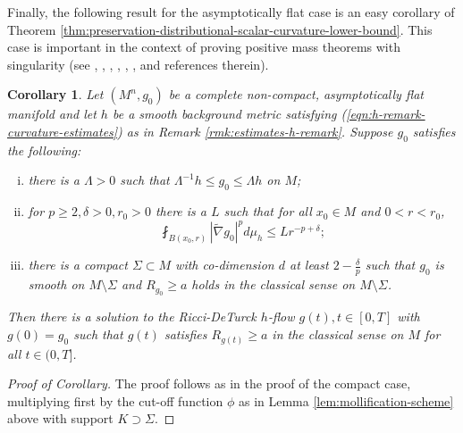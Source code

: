 \documentclass[12pt]{amsart}
\newcommand{\hdel}{\tilde{\nabla}}
\newtheorem{cor}[thm]{Corollary}
\theoremstyle{remark}
\numberwithin{equation}{section}
\begin{document}
Finally, the following result for the asymptotically flat case is an easy corollary of Theorem \ref{thm:preservation-distributional-scalar-curvature-lower-bound}. This case is important in the context of proving positive mass theorems with singularity (see \cite{miao_positive_2003}, \cite{lee_positive_2013}, \cite{lee_positive_2015}, \cite{shi_scalar_2016}, \cite{jiang_removable_2022}, \cite{lee_continuous_2021}, \cite{chu_ricci-deturck_2022} and references therein).

\begin{cor}\label{thm:non-cpt-dist-scalar-curvature-lower-bdd}
    Let $(M^n, g_0)$ be a complete non-compact, asymptotically flat manifold and let $h$ be a smooth background metric satisfying (\ref{eqn:h-remark-curvature-estimates}) as in Remark \ref{rmk:estimates-h-remark}. Suppose $g_0$ satisfies the following:
    \begin{enumerate}[(i)]
        \item there is a $\Lambda > 0$ such that $\Lambda^{-1}h \leq g_0 \leq \Lambda h$ on $M$;
        \item for $p \geq 2, \delta > 0, r_0 > 0$ there is a $L$ such that for all $x_0 \in M$ and $0 < r < r_0$,
        \begin{equation}
            \fint_{B(x_0, r)} |\hdel g_0|^p d\mu_h \leq L r^{-p + \delta};
        \end{equation}
        \item there is a compact $\Sigma \subset M$ with co-dimension $d$ at least $2 - \frac{\delta}{p}$ such that $g_0$ is smooth on $M \setminus \Sigma$ and $R_{g_0} \geq a$ holds in the classical sense on $M \setminus \Sigma$.
    \end{enumerate}
    Then there is a solution to the Ricci-DeTurck $h$-flow $g(t), t\in [0,T]$ with $g(0) = g_0$ such that $g(t)$ satisfies $R_{g(t)} \geq a$ in the classical sense on $M$ for all $t \in (0, T]$.
\end{cor}

\begin{proof}[Proof of Corollary]
    The proof follows as in the proof of the compact case, multiplying first by the cut-off function $\phi$ as in Lemma \ref{lem:mollification-scheme} above with support $K \supset \Sigma$.
\end{proof}


\begin{thebibliography}{100}
\end{thebibliography}
\end{document}
